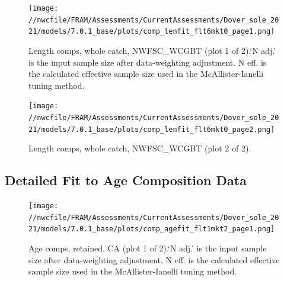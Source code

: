 \documentclass[11pt,
  english,
  a4paper,
]{article}
\begin{document}
\tagmcend\tagstructend


\begin{figure}
\centering
\texttt{[image: //nwcfile/FRAM/Assessments/CurrentAssessments/Dover\_sole\_2021/models/7.0.1\_base/plots/comp\_lenfit\_flt6mkt0\_page1.png]}
\caption{Length comps, whole catch, NWFSC\_WCGBT (plot 1 of 2).`N adj.' is the input sample size after data-weighting adjustment. N eff. is the calculated effective sample size used in the McAllister-Ianelli tuning method.\label{fig:comp_lenfit_flt6mkt0_page1}}
\end{figure}

\tagmcend\tagstructend


\begin{figure}
\centering
\texttt{[image: //nwcfile/FRAM/Assessments/CurrentAssessments/Dover\_sole\_2021/models/7.0.1\_base/plots/comp\_lenfit\_flt6mkt0\_page2.png]}
\caption{Length comps, whole catch, NWFSC\_WCGBT (plot 2 of 2).\label{fig:comp_lenfit_flt6mkt0_page2}}
\end{figure}

\tagmcend\tagstructend

\clearpage


\hypertarget{age-fit-data}{%
\subsection{Detailed Fit to Age Composition Data}\label{age-fit-data}}

\leavevmode\tagmcend\tagstructend


\begin{figure}
\centering
\texttt{[image: //nwcfile/FRAM/Assessments/CurrentAssessments/Dover\_sole\_2021/models/7.0.1\_base/plots/comp\_agefit\_flt1mkt2\_page1.png]}
\caption{Age comps, retained, CA (plot 1 of 2).`N adj.' is the input sample size after data-weighting adjustment. N eff. is the calculated effective sample size used in the McAllister-Ianelli tuning method.\label{fig:comp_agefit_flt1mkt2_page1}}
\end{figure}
\end{document}
